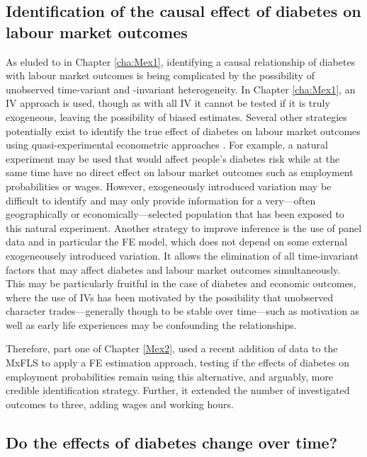 \subsection{Identification of the causal effect of diabetes on labour market outcomes}

As eluded to in Chapter \ref{cha:Mex1}, identifying a causal relationship of diabetes with labour market outcomes is being complicated by the possibility of unobserved time-variant and -invariant heterogeneity. In Chapter \ref{cha:Mex1}, an \ac{IV} approach is used, though as with all \ac{IV} it cannot be tested if it is truly exogeneous, leaving the possibility of biased estimates. Several other strategies potentially exist to identify the true effect of diabetes on labour market outcomes using quasi-experimental econometric approaches \parencite{Antonakis2012}. For example, a natural experiment may be used that would affect people's diabetes risk while at the same time have no direct effect on labour market outcomes such as employment probabilities or wages. However, exogeneously introduced variation may be difficult to identify and may only provide information for a very---often geographically or economically---selected population that has been exposed to this natural experiment. Another strategy to improve inference is the use of panel data and in particular the \ac{FE} model, which does not depend on some external exogeneousely introduced variation. It allows the elimination of all time-invariant factors that may affect diabetes and labour market outcomes simultaneously. This may be particularly fruitful in the case of diabetes and economic outcomes, where the use of \ac{IV}s has been motivated by the possibility that unobserved character trades---generally though to be stable over time---such as motivation as well as early life experiences may be confounding the relationships.

Therefore, part one of Chapter \ref{Mex2}, used a recent addition of data to the \ac{MxFLS} to apply a \ac{FE} estimation approach, testing if the effects of diabetes on employment probabilities remain using this alternative, and arguably, more credible identification strategy. Further, it extended the number of investigated outcomes to three, adding wages and working hours.

\subsection{Do the effects of diabetes change over time?}

